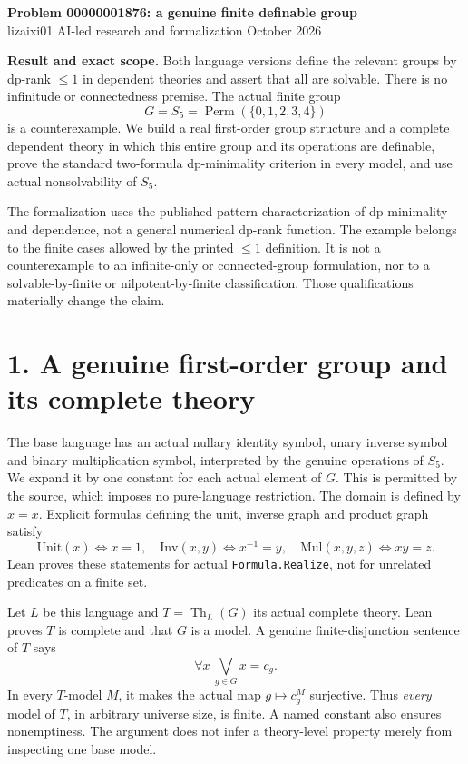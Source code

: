 \documentclass[10pt]{article}
\begin{document}
\begin{center}
{\Large\bfseries Problem 00000001876: a genuine finite definable group}\\[5pt]
lizaixi01 \quad AI-led research and formalization  October 2026
\end{center}

\textbf{Result and exact scope.} Both language versions define the relevant groups by dp-rank $\le1$ in dependent theories and assert that all are solvable. There is no infinitude or connectedness premise. The actual finite group
\[
 G=S_5=\operatorname{Perm}(\{0,1,2,3,4\})
\]
is a counterexample. We build a real first-order group structure and a complete dependent theory in which this entire group and its operations are definable, prove the standard two-formula dp-minimality criterion in every model, and use actual nonsolvability of $S_5$.

The formalization uses the published pattern characterization of dp-minimality and dependence, not a general numerical dp-rank function. The example belongs to the finite cases allowed by the printed $\le1$ definition. It is not a counterexample to an infinite-only or connected-group formulation, nor to a solvable-by-finite or nilpotent-by-finite classification. Those qualifications materially change the claim.

\section*{1. A genuine first-order group and its complete theory}
The base language has an actual nullary identity symbol, unary inverse symbol and binary multiplication symbol, interpreted by the genuine operations of $S_5$. We expand it by one constant for each actual element of $G$. This is permitted by the source, which imposes no pure-language restriction. The domain is defined by $x=x$. Explicit formulas defining the unit, inverse graph and product graph satisfy
\[
 \mathrm{Unit}(x)\iff x=1,\quad
 \mathrm{Inv}(x,y)\iff x^{-1}=y,\quad
 \mathrm{Mul}(x,y,z)\iff xy=z.
\]
Lean proves these statements for actual \texttt{Formula.Realize}, not for unrelated predicates on a finite set.

Let $L$ be this language and $T=\operatorname{Th}_L(G)$ its actual complete theory. Lean proves $T$ is complete and that $G$ is a model. A genuine finite-disjunction sentence of $T$ says
\[
 \forall x\ \bigvee_{g\in G}x=c_g.
\]
In every $T$-model $M$, it makes the actual map $g\mapsto c_g^M$ surjective. Thus \emph{every} model of $T$, in arbitrary universe size, is finite. A named constant also ensures nonemptiness. The argument does not infer a theory-level property merely from inspecting one base model.
\end{document}
